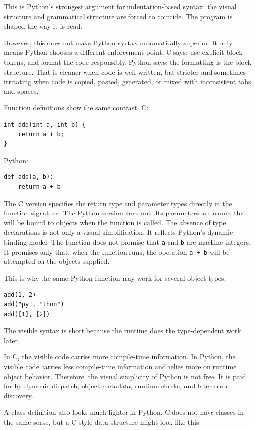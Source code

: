 This is Python's strongest argument for indentation-based syntax: the visual structure and grammatical structure are forced to coincide. The program is shaped the way it is read.

However, this does not make Python syntax automatically superior. It only means Python chooses a different enforcement point. C says: use explicit block tokens, and format the code responsibly. Python says: the formatting is the block structure. That is cleaner when code is well written, but stricter and sometimes irritating when code is copied, pasted, generated, or mixed with inconsistent tabs and spaces.

Function definitions show the same contrast. C:

\begin{verbatim}
int add(int a, int b) {
    return a + b;
}
\end{verbatim}

Python:

\begin{verbatim}
def add(a, b):
    return a + b
\end{verbatim}

The C version specifies the return type and parameter types directly in the function signature. The Python version does not. Its parameters are names that will be bound to objects when the function is called. The absence of type declarations is not only a visual simplification. It reflects Python's dynamic binding model. The function does not promise that \texttt{a} and \texttt{b} are machine integers. It promises only that, when the function runs, the operation \texttt{a + b} will be attempted on the objects supplied.

This is why the same Python function may work for several object types:

\begin{verbatim}
add(1, 2)
add("py", "thon")
add([1], [2])
\end{verbatim}

The visible syntax is short because the runtime does the type-dependent work later.

In C, the visible code carries more compile-time information. In Python, the visible code carries less compile-time information and relies more on runtime object behavior. Therefore, the visual simplicity of Python is not free. It is paid for by dynamic dispatch, object metadata, runtime checks, and later error discovery.

A class definition also looks much lighter in Python. C does not have classes in the same sense, but a C-style data structure might look like this:

